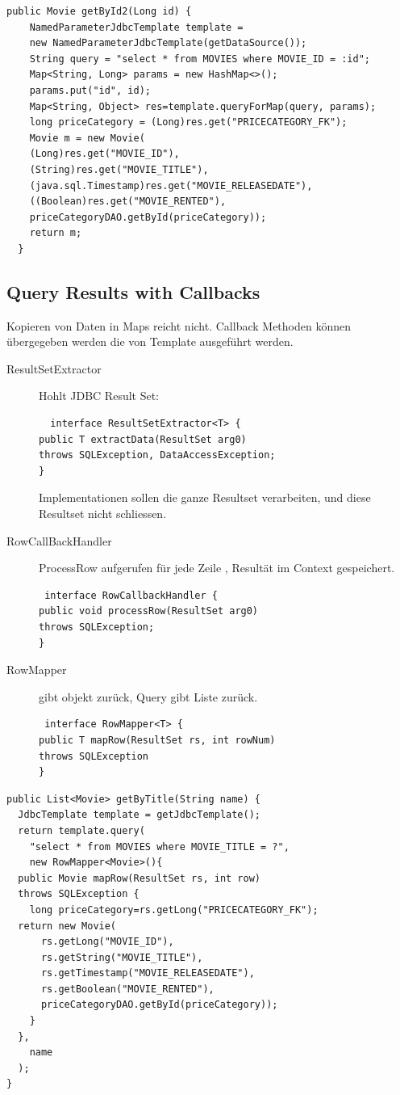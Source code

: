 \documentclass[a4paper,10pt]{scrreprt}
\begin{document}
\begin{lstlisting}[caption=JDBC Query Results (Named Parameters]
 public Movie getById2(Long id) {
    NamedParameterJdbcTemplate template =
    new NamedParameterJdbcTemplate(getDataSource());
    String query = "select * from MOVIES where MOVIE_ID = :id";
    Map<String, Long> params = new HashMap<>();
    params.put("id", id);
    Map<String, Object> res=template.queryForMap(query, params);
    long priceCategory = (Long)res.get("PRICECATEGORY_FK");
    Movie m = new Movie(
    (Long)res.get("MOVIE_ID"),
    (String)res.get("MOVIE_TITLE"),
    (java.sql.Timestamp)res.get("MOVIE_RELEASEDATE"),
    ((Boolean)res.get("MOVIE_RENTED"),
    priceCategoryDAO.getById(priceCategory));
    return m;
  }
\end{lstlisting}

\subsection{Query Results with Callbacks}
Kopieren von Daten in Maps reicht nicht. Callback Methoden können übergegeben werden die von Template ausgeführt werden.

\begin{description}
 \item [ResultSetExtractor] Hohlt JDBC Result Set: \\
 \begin{verbatim}
  interface ResultSetExtractor<T> {
public T extractData(ResultSet arg0)
throws SQLException, DataAccessException;
}
 \end{verbatim}
Implementationen sollen die ganze Resultset verarbeiten, und diese Resultset nicht schliessen.
\item[RowCallBackHandler] ProcessRow aufgerufen für jede Zeile , Resultät im Context gespeichert.
\begin{verbatim}
 interface RowCallbackHandler {
public void processRow(ResultSet arg0)
throws SQLException;
}

\end{verbatim}
\item[RowMapper] gibt objekt zurück, Query gibt Liste zurück.
\begin{verbatim}
 interface RowMapper<T> {
public T mapRow(ResultSet rs, int rowNum)
throws SQLException
}
\end{verbatim}

\end{description}
\begin{lstlisting}[caption=QueryResults Callback Example JDBC]
 public List<Movie> getByTitle(String name) {
  JdbcTemplate template = getJdbcTemplate();
  return template.query(
    "select * from MOVIES where MOVIE_TITLE = ?",
    new RowMapper<Movie>(){	
  public Movie mapRow(ResultSet rs, int row)
  throws SQLException {
    long priceCategory=rs.getLong("PRICECATEGORY_FK");
  return new Movie(
      rs.getLong("MOVIE_ID"),
      rs.getString("MOVIE_TITLE"),
      rs.getTimestamp("MOVIE_RELEASEDATE"),
      rs.getBoolean("MOVIE_RENTED"),
      priceCategoryDAO.getById(priceCategory));
    }
  },
    name
  );
}
\end{lstlisting}
\end{document}
